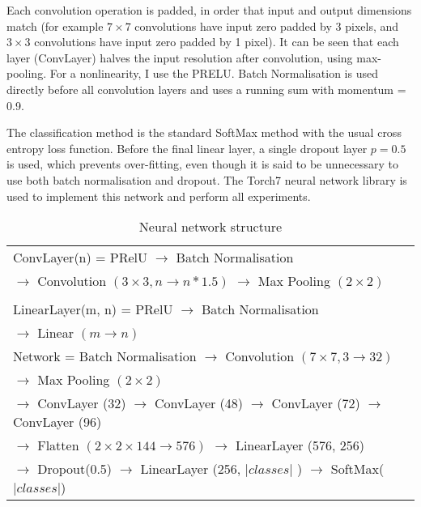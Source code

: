 Each convolution operation is padded, in order that input and output dimensions match (for example $ 7\times7 $ convolutions have input zero padded by 3 pixels, and $3\times3$ convolutions have input zero padded by 1 pixel). It can be seen that each layer (ConvLayer) halves the input resolution after convolution, using max-pooling. For a nonlinearity, I use the \gls{PRELU}. Batch Normalisation is used directly before all convolution layers and uses a running sum with momentum = 0.9.

The classification method is the standard SoftMax method with the usual cross entropy loss function. Before the final linear layer, a single dropout layer $ p = 0.5 $ is used, which prevents over-fitting, even though it is said to be unnecessary to use both batch normalisation and dropout.  The Torch7 \cite{Collobert2011a} neural network library is used to implement this network and perform all experiments. 

\begin{table}[h]
  \centering
    \caption{Neural network structure }
\begin{tabular}{ l } 

\toprule

 ConvLayer(n) = PRelU $\rightarrow$ Batch Normalisation \\ 
 $\rightarrow$  Convolution $(3\times3, n \rightarrow n * 1.5)$ $\rightarrow$  Max Pooling $(2\times2)$ \\
\\
 LinearLayer(m, n)  = PRelU $\rightarrow$ Batch Normalisation \\  $\rightarrow$  Linear $(m \rightarrow n)$ \\
\toprule
  Network = Batch Normalisation $\rightarrow$
 Convolution $(7\times7, 3 \rightarrow 32)$ \\
 $\rightarrow$ Max Pooling $(2\times2)$   \\

  $\rightarrow$ ConvLayer (32) $\rightarrow$  ConvLayer (48) $\rightarrow$ ConvLayer (72) $\rightarrow$ ConvLayer (96)   \\
  
  
  $\rightarrow$ Flatten $(2\times2\times144 \rightarrow 576)$ $\rightarrow$ LinearLayer (576, 256) \\
  
  $\rightarrow$ Dropout(0.5) $\rightarrow$ LinearLayer (256, $\vert classes \vert$ )  $\rightarrow$  SoftMax($\vert classes \vert$) \\
  
    
       
\toprule
\end{tabular}

\label{fig:focus_network}
\end{table}




